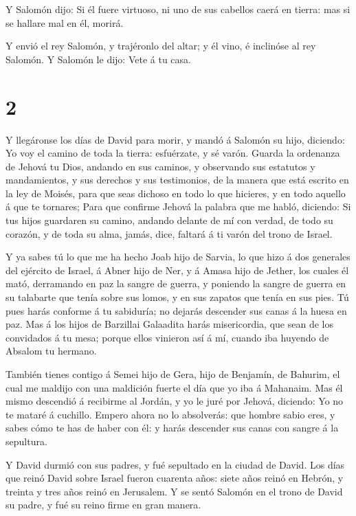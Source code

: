  Y Salomón dijo: Si él fuere virtuoso, ni uno de sus
cabellos caerá en tierra: mas si se hallare mal en él, morirá.

 Y envió el rey Salomón, y trajéronlo del altar; y él vino,
é inclinóse al rey Salomón. Y Salomón le dijo: Vete á tu casa.

\hypertarget{section-1}{%
\section{2}\label{section-1}}

 Y llegáronse los días de David para morir, y mandó á
Salomón su hijo, diciendo:  Yo voy el camino de toda la
tierra: esfuérzate, y sé varón.  Guarda la ordenanza de
Jehová tu Dios, andando en sus caminos, y observando sus estatutos y
mandamientos, y sus derechos y sus testimonios, de la manera que está
escrito en la ley de Moisés, para que seas dichoso en todo lo que
hicieres, y en todo aquello á que te tornares;  Para que
confirme Jehová la palabra que me habló, diciendo: Si tus hijos
guardaren su camino, andando delante de mí con verdad, de todo su
corazón, y de toda su alma, jamás, dice, faltará á ti varón del trono de
Israel.

 Y ya sabes tú lo que me ha hecho Joab hijo de Sarvia, lo
que hizo á dos generales del ejército de Israel, á Abner hijo de Ner, y
á Amasa hijo de Jether, los cuales él mató, derramando en paz la sangre
de guerra, y poniendo la sangre de guerra en su talabarte que tenía
sobre sus lomos, y en sus zapatos que tenía en sus pies.  Tú
pues harás conforme á tu sabiduría; no dejarás descender sus canas á la
huesa en paz.  Mas á los hijos de Barzillai Galaadita harás
misericordia, que sean de los convidados á tu mesa; porque ellos
vinieron así á mí, cuando iba huyendo de Absalom tu hermano.

 También tienes contigo á Semei hijo de Gera, hijo de
Benjamín, de Bahurim, el cual me maldijo con una maldición fuerte el día
que yo iba á Mahanaim. Mas él mismo descendió á recibirme al Jordán, y
yo le juré por Jehová, diciendo: Yo no te mataré á cuchillo.
 Empero ahora no lo absolverás: que hombre sabio eres, y
sabes cómo te has de haber con él: y harás descender sus canas con
sangre á la sepultura.

 Y David durmió con sus padres, y fué sepultado en la
ciudad de David.  Los días que reinó David sobre Israel
fueron cuarenta años: siete años reinó en Hebrón, y treinta y tres años
reinó en Jerusalem.  Y se sentó Salomón en el trono de
David su padre, y fué su reino firme en gran manera.

